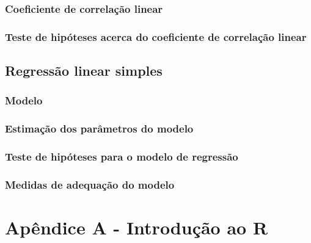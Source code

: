 \documentclass[
]{book}
\begin{document}
\hypertarget{coeficiente-de-correlauxe7uxe3o-linear}{%
\subsection{Coeficiente de correlação linear}\label{coeficiente-de-correlauxe7uxe3o-linear}}

\hypertarget{teste-de-hipuxf3teses-acerca-do-coeficiente-de-correlauxe7uxe3o-linear}{%
\subsection{Teste de hipóteses acerca do coeficiente de correlação linear}\label{teste-de-hipuxf3teses-acerca-do-coeficiente-de-correlauxe7uxe3o-linear}}

\hypertarget{regressuxe3o-linear-simples}{%
\section{Regressão linear simples}\label{regressuxe3o-linear-simples}}

\hypertarget{modelo}{%
\subsection{Modelo}\label{modelo}}

\hypertarget{estimauxe7uxe3o-dos-paruxe2metros-do-modelo}{%
\subsection{Estimação dos parâmetros do modelo}\label{estimauxe7uxe3o-dos-paruxe2metros-do-modelo}}

\hypertarget{teste-de-hipuxf3teses-para-o-modelo-de-regressuxe3o}{%
\subsection{Teste de hipóteses para o modelo de regressão}\label{teste-de-hipuxf3teses-para-o-modelo-de-regressuxe3o}}

\hypertarget{medidas-de-adequauxe7uxe3o-do-modelo}{%
\subsection{Medidas de adequação do modelo}\label{medidas-de-adequauxe7uxe3o-do-modelo}}

\hypertarget{apuxeandice-a---introduuxe7uxe3o-ao-r}{%
\chapter*{Apêndice A - Introdução ao R}\label{apuxeandice-a---introduuxe7uxe3o-ao-r}}


  
\end{document}

